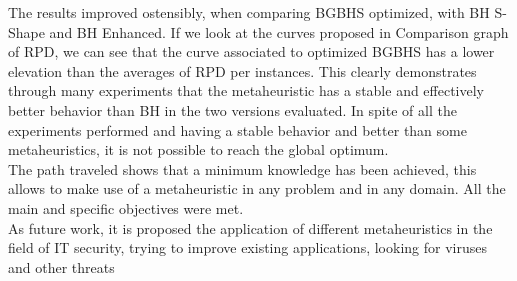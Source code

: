 The results improved ostensibly, when comparing BGBHS optimized, with BH S-Shape and BH Enhanced. If we look at the curves proposed in Comparison graph of RPD, we can see that the curve associated to optimized BGBHS has a lower elevation than the averages of RPD per instances. This clearly demonstrates through many experiments that the metaheuristic has a stable and effectively better behavior than BH in the two versions evaluated. In spite of all the experiments performed and having a stable behavior and better than some metaheuristics, it is not possible to reach the global optimum.\\

The path traveled shows that a minimum knowledge has been achieved, this allows to make use of a metaheuristic in any problem and in any domain. All the main and specific objectives were met.\\

As future work, it is proposed the application of different metaheuristics in the field of IT security, trying to improve existing applications, looking for viruses and other threats \cite{Edge_aretrovirus, Mehdi:2009:IIM:1569901.1570109, Noreen:2009:EM:1569901.1570111, Shafiq:2009:AER:1570256.1570370, NajwadiYusoff00000060, DBLP:conf/iccci/DemertzisI15}














